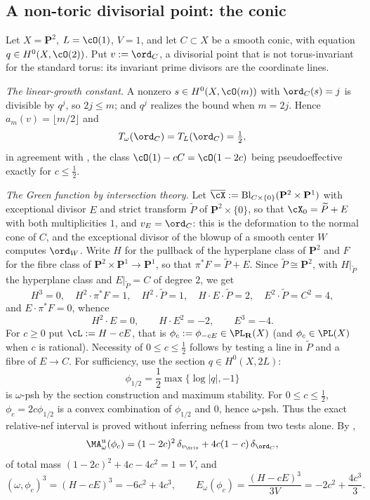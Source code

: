 \subsection{A non-toric divisorial point: the conic}
\label{sec:ch49-conic}

\begin{example}
\label{ex:ch49-conic}
Let $X=\mathbf P^2$, $L=\cO(1)$, $V=1$, and let $C\subset X$ be a
smooth conic, with equation $q\in H^0(X,\cO(2))$.  Put $v:=\ord_C$, a
divisorial point that is not torus-invariant for the standard torus:
its invariant prime divisors are the coordinate lines.

\emph{The linear-growth constant.}  A nonzero $s\in H^0(X,\cO(m))$ with
$\ord_C(s)=j$ is divisible by $q^j$, so $2j\le m$; and $q^{j}$
realizes the bound when $m=2j$.  Hence $a_m(v)=\lfloor m/2\rfloor$ and
\[
 T_\omega(\ord_C)=T_L(\ord_C)=\tfrac12 ,
\]
in agreement with , the class
$\cO(1)-cC=\cO(1-2c)$ being pseudoeffective exactly for $c\le\tfrac12$.

\emph{The Green function by intersection theory.}  Let
$\overline\cX:=\operatorname{Bl}_{C\times\{0\}}(\mathbf P^2\times\mathbf P^1)$
with exceptional divisor $E$ and strict transform $\widetilde P$ of
$\mathbf P^2\times\{0\}$, so that $\cX_0=\widetilde P+E$ with both
multiplicities $1$, and $v_E=\ord_C$: this is the deformation to the
normal cone of $C$, and the exceptional divisor of the blowup of a smooth
center $W$ computes $\ord_W$.  Write $H$ for the pullback of the
hyperplane class of $\mathbf P^2$ and $F$ for the fibre class of
$\mathbf P^2\times\mathbf P^1\to\mathbf P^1$, so that
$\pi^*F=\widetilde P+E$.  Since $\widetilde P\cong\mathbf P^2$, with
$H|_{\widetilde P}$ the hyperplane class and
$E|_{\widetilde P}=C$ of degree $2$, we get
\[
 H^3=0,\quad
 H^2\cdot\pi^*F=1,\quad
 H^2\cdot\widetilde P=1,\quad
 H\cdot E\cdot\widetilde P=2,\quad
 E^2\cdot\widetilde P=C^2=4 ,
\]
and $E\cdot\pi^*F=0$, whence
\[
 H^2\cdot E=0,\qquad
 H\cdot E^2=-2,\qquad
 E^3=-4 .
\]
For $c\ge0$ put $\cL:=H-cE$, that is
$\phi_c:=\phi_{-cE}\in\PL_{\mathbf R}(X)$
(and $\phi_c\in\PL(X)$ when $c$ is rational).  Necessity of $0\le c\le\tfrac12$ follows by testing a line
in $\widetilde P$ and a fibre of $E\to C$.
For sufficiency, use the section $q\in H^0(X,2L)$:
\[
 \phi_{1/2}=\frac12\max\{\log|q|,-1\}
\]
is $\omega$-psh by the section construction and maximum stability.
For $0\le c\le\tfrac12$, $\phi_c=2c\phi_{1/2}$ is a convex
combination of $\phi_{1/2}$ and $0$, hence $\omega$-psh.
Thus the exact relative-nef interval is proved without inferring
nefness from two tests alone.  By
,
\[
 \MA^{\mathrm u}_\omega(\phi_c)
 =(1-2c)^2\,\delta_{v_{\triv}}+4c(1-c)\,\delta_{\ord_C},
\]
of total mass $(1-2c)^2+4c-4c^2=1=V$, and
\[
 (\omega,\phi_c)^3=(H-cE)^3=-6c^2+4c^3,
 \qquad
 E_\omega(\phi_c)=\frac{(H-cE)^3}{3V}=-2c^2+\frac{4c^3}{3}.
\]


\end{example}
